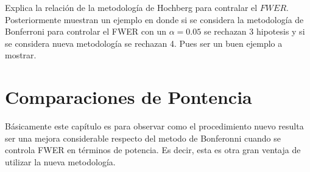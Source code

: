\documentclass[11pt,letterpaper]{article}
\begin{document}
Explica la relación de la metodología de Hochberg para contralar el $FWER$. \\

Posteriormente muestran un ejemplo en donde si se considera la metodología de Bonferroni para controlar el FWER con un $\alpha=0.05$ se rechazan 3 hipotesis y si se considera nueva metodología se rechazan 4. Pues ser un buen ejemplo a mostrar.

\section{Comparaciones de Pontencia}
Básicamente este capítulo es para observar como el  procedimiento nuevo resulta ser una mejora considerable respecto del metodo de Bonferonni cuando se controla FWER en términos de potencia. Es decir, esta es otra gran ventaja de utilizar la nueva metodología.
\end{document}
